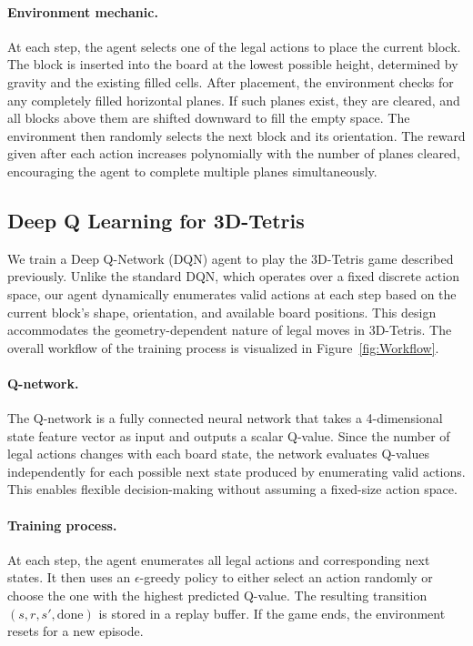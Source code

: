 \paragraph{Environment mechanic.}
At each step, the agent selects one of the legal actions to place the current block. The block is inserted into the board at the lowest possible height, determined by gravity and the existing filled cells. After placement, the environment checks for any completely filled horizontal planes. If such planes exist, they are cleared, and all blocks above them are shifted downward to fill the empty space. The environment then randomly selects the next block and its orientation. The reward given after each action increases polynomially with the number of planes cleared, encouraging the agent to complete multiple planes simultaneously.

\subsection{Deep Q Learning for 3D-Tetris}
We train a Deep Q-Network (DQN) agent to play the 3D-Tetris game described previously. Unlike the standard DQN, which operates over a fixed discrete action space, our agent dynamically enumerates valid actions at each step based on the current block's shape, orientation, and available board positions. This design accommodates the geometry-dependent nature of legal moves in 3D-Tetris. The overall workflow of the training process is visualized in Figure~\ref{fig:Workflow}.

\paragraph{Q-network.}
The Q-network is a fully connected neural network that takes a 4-dimensional state feature vector as input and outputs a scalar Q-value. Since the number of legal actions changes with each board state, the network evaluates Q-values independently for each possible next state produced by enumerating valid actions. This enables flexible decision-making without assuming a fixed-size action space.

\paragraph{Training process.}
At each step, the agent enumerates all legal actions and corresponding next states. It then uses an $\epsilon$-greedy policy to either select an action randomly or choose the one with the highest predicted Q-value. The resulting transition $(s, r, s', \text{done})$ is stored in a replay buffer. If the game ends, the environment resets for a new episode.

